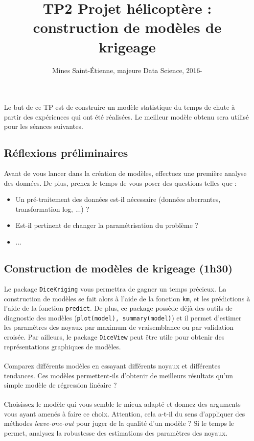 \documentclass[a4paper,10pt]{article}
\title{\vspace{-1cm} TP2 Projet hélicoptère : construction de modèles de krigeage}
\author{Mines Saint-\'Etienne, majeure Data Science,  2016\:-\:2017 }
\date{}
\begin{document}
\maketitle
Le but de ce TP est de construire un modèle statistique du temps de chute à partir des expériences qui ont été réalisées. Le meilleur modèle obtenu sera utilisé pour les séances suivantes.

\subsection*{Réflexions préliminaires}
Avant de vous lancer dans la création de modèles, effectuez une première analyse des données. De plus, prenez le temps de vous poser des questions telles que :
\begin{itemize}
	\item Un pré-traitement des données est-il nécessaire (données aberrantes, transformation log, ...) ?
 	\item Est-il pertinent de changer la paramétrisation du problème ? 
 	\item ...
\end{itemize} 

\subsection*{Construction de modèles de krigeage (1h30)}

Le package \texttt{DiceKriging} vous permettra de gagner un temps précieux. La construction de modèles se fait alors à l'aide de la fonction \texttt{km}, et les prédictions à l'aide de la fonction  \texttt{predict}. De plus, ce package possède déjà des outils de diagnostic des modèles (\texttt{plot(model), summary(model)}) et il permet d'estimer les paramètres des noyaux par maximum de vraisemblance ou par validation croisée. Par ailleurs, le package \texttt{DiceView} peut être utile pour obtenir des représentations graphiques de modèles.

\paragraph{}
Comparez différents modèles en essayant différents noyaux et différentes tendances. Ces modèles permettent-ils d'obtenir de meilleurs résultats qu'un simple modèle de régression linéaire ?

\paragraph{}
Choisissez le modèle qui vous semble le mieux adapté et donnez des arguments vous ayant amenés à faire ce choix. Attention, cela a-t-il du sens d'appliquer des méthodes \emph{leave-one-out} pour juger de la qualité d'un modèle ?
Si le temps le permet, analysez la robustesse des estimations des paramètres des noyaux.
\end{document}
